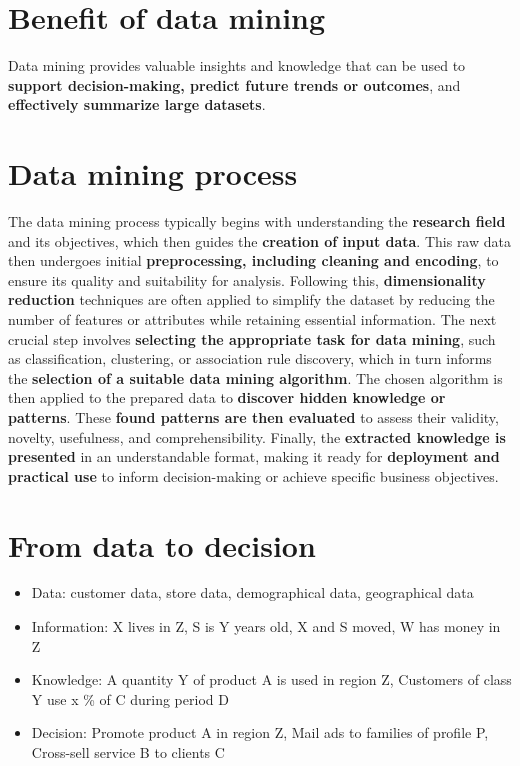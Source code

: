 \section{Benefit of data mining}
Data mining provides valuable insights and knowledge that can be used to \textbf{support decision-making, predict future trends or outcomes}, and \textbf{effectively summarize large datasets}.
\section{Data mining process}
The data mining process typically begins with understanding the \textbf{research field} and its objectives, which then guides the \textbf{creation of input data}. This raw data then undergoes initial \textbf{preprocessing, including cleaning and encoding}, to ensure its quality and suitability for analysis. Following this, \textbf{dimensionality reduction} techniques are often applied to simplify the dataset by reducing the number of features or attributes while retaining essential information. The next crucial step involves \textbf{selecting the appropriate task for data mining}, such as classification, clustering, or association rule discovery, which in turn informs the \textbf{selection of a suitable data mining algorithm}. The chosen algorithm is then applied to the prepared data to \textbf{discover hidden knowledge or patterns}. These \textbf{found patterns are then evaluated} to assess their validity, novelty, usefulness, and comprehensibility. Finally, the \textbf{extracted knowledge is presented} in an understandable format, making it ready for \textbf{deployment and practical use} to inform decision-making or achieve specific business objectives.
\section{From data to decision}
\begin{itemize}
\item Data: customer data, store data, demographical data, geographical data
\item Information: X lives in Z, S is Y years old, X and S moved, W has money in Z
\item Knowledge: A quantity Y of product A is used in region Z, Customers of class
      Y use x \% of C during period D
\item Decision: Promote product A in region Z, Mail ads to families of profile
      P, Cross-sell service B to clients C
\end{itemize}
